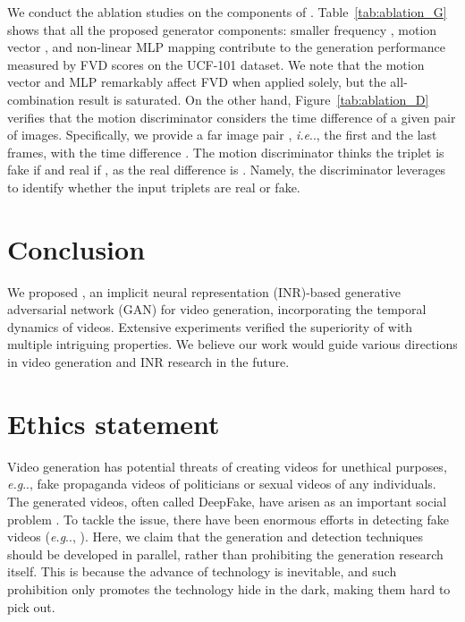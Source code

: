 \documentclass{article} \usepackage{iclr2022_conference,times}
\makeatletter
\DeclareRobustCommand\onedot{\futurelet\@let@token\@onedot}
\def\@onedot{\ifx\@let@token.\else.\null\fi\xspace}
\def\eg{\emph{e.g}\onedot} \def\Eg{\emph{E.g}\onedot}
\def\ie{\emph{i.e}\onedot} \def\Ie{\emph{I.e}\onedot}
\makeatother
\begin{document}
We conduct the ablation studies on the components of \sname. Table~\ref{tab:ablation_G} shows that all the proposed generator components: smaller frequency , motion vector , and non-linear MLP mapping  contribute to the generation performance measured by FVD scores on the UCF-101 dataset. We note that the motion vector  and MLP  remarkably affect FVD when applied solely, but the all-combination result is saturated. On the other hand, Figure~\ref{tab:ablation_D} verifies that the motion discriminator considers the time difference  of a given pair of images. Specifically, we provide a far image pair , \ie, the first and the last frames, with the time difference . The motion discriminator thinks the triplet  is fake if  and real if , as the real difference is . Namely, the discriminator leverages  to identify whether the input triplets are real or fake.


\vspace{-0.1in}
\section{Conclusion}
\vspace{-0.05in}

We proposed \sname, an implicit neural representation (INR)-based generative adversarial network (GAN) for video generation, incorporating the temporal dynamics of videos. Extensive experiments verified the superiority of \sname with multiple intriguing properties. We believe our work would guide various directions in video generation and INR research in the future.

\section*{Ethics statement}

Video generation has potential threats of creating videos for unethical purposes, \eg, fake propaganda videos of politicians or sexual videos of any individuals. The generated videos, often called DeepFake, have arisen as an important social problem \citep{mika2019emergence}. To tackle the issue, there have been enormous efforts in detecting fake videos (\eg, \citet{guera2018deepfake}). Here, we claim that the generation and detection techniques should be developed in parallel, rather than prohibiting the generation research itself. This is because the advance of technology is inevitable, and such prohibition only promotes the technology hide in the dark, making them hard to pick out.
\end{document}
